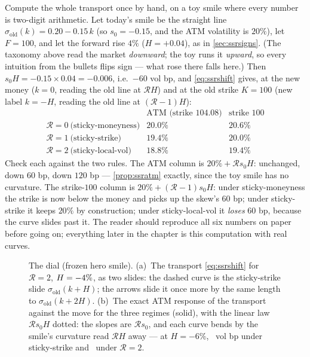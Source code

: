 Compute the whole transport once by hand, on a toy smile where every
number is two-digit arithmetic.  Let today's smile be the straight
line $\sigma_{\mathrm{old}}(k)=0.20-0.15\,k$ (so $s_0=-0.15$, and the
ATM volatility is $20\%$), let $F=100$, and let the forward rise
$4\%$ ($H=+0.04$), as in \cref{sec:ssrsigns}.  (The taxonomy above
read the market \emph{downward}; the toy runs it \emph{upward}, so
every intuition from the bullets flips sign --- what rose there falls
here.)  Then
$s_0H=-0.15\times0.04=-0.006$, i.e.\ $-60$ vol bp, and
\eqref{eq:ssrshift} gives, at the new money
($k=0$, reading the old line at $\mathcal{R}H$) and at the old strike
$K=100$ (new label $k=-H$, reading the old line at
$(\mathcal{R}-1)H$):
\[
\begin{array}{lcc}
 & \text{ATM (strike }104.08\text{)} & \text{strike }100\\[2pt]
\mathcal{R}=0\ \text{(sticky-moneyness)} & 20.0\% & 20.6\%\\
\mathcal{R}=1\ \text{(sticky-strike)}    & 19.4\% & 20.0\%\\
\mathcal{R}=2\ \text{(sticky-local-vol)} & 18.8\% & 19.4\%
\end{array}
\]
Check each against the two rules.  The ATM column is
$20\%+\mathcal{R}s_0H$: unchanged, down $60$ bp, down $120$ bp ---
\cref{prop:ssratm} exactly, since the toy smile has no curvature.  The
strike-$100$ column is $20\%+(\mathcal{R}-1)s_0H$: under
sticky-moneyness the strike is now below the money and picks up the
skew's $60$ bp; under sticky-strike it keeps $20\%$ by construction;
under sticky-local-vol it \emph{loses} $60$ bp, because the curve
slides past it.  The reader should reproduce all six
numbers on paper before going on; everything later in the chapter is
this computation with real curves.

\begin{figure}[htbp]
\centering
{}
\caption{The dial (frozen hero smile).  (a)~The transport
\eqref{eq:ssrshift} for $\mathcal{R}=2$, $H=-4\%$,
as two slides: the dashed curve is the sticky-strike slide
$\sigma_{\mathrm{old}}(k+H)$; the arrows slide it once more by the
same length to $\sigma_{\mathrm{old}}(k+2H)$.  (b)~The exact ATM
response of the transport against the move for the three regimes
(solid), with the linear law $\mathcal{R}s_0H$ dotted: the slopes are
$\mathcal{R}s_0$, and each curve bends by the smile's curvature read
$\mathcal{R}H$ away --- at $H=-6\%$, \MacSsrDialBendBp\ vol bp under
sticky-strike and \MacSsrDialBendTwoBp\ under $\mathcal{R}=2$.}
\label{fig:ssrdial}
\end{figure}

